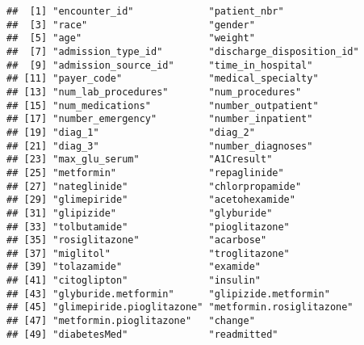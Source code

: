 \documentclass[
]{article}
\begin{document}
\begin{verbatim}
##  [1] "encounter_id"             "patient_nbr"             
##  [3] "race"                     "gender"                  
##  [5] "age"                      "weight"                  
##  [7] "admission_type_id"        "discharge_disposition_id"
##  [9] "admission_source_id"      "time_in_hospital"        
## [11] "payer_code"               "medical_specialty"       
## [13] "num_lab_procedures"       "num_procedures"          
## [15] "num_medications"          "number_outpatient"       
## [17] "number_emergency"         "number_inpatient"        
## [19] "diag_1"                   "diag_2"                  
## [21] "diag_3"                   "number_diagnoses"        
## [23] "max_glu_serum"            "A1Cresult"               
## [25] "metformin"                "repaglinide"             
## [27] "nateglinide"              "chlorpropamide"          
## [29] "glimepiride"              "acetohexamide"           
## [31] "glipizide"                "glyburide"               
## [33] "tolbutamide"              "pioglitazone"            
## [35] "rosiglitazone"            "acarbose"                
## [37] "miglitol"                 "troglitazone"            
## [39] "tolazamide"               "examide"                 
## [41] "citoglipton"              "insulin"                 
## [43] "glyburide.metformin"      "glipizide.metformin"     
## [45] "glimepiride.pioglitazone" "metformin.rosiglitazone" 
## [47] "metformin.pioglitazone"   "change"                  
## [49] "diabetesMed"              "readmitted"
\end{verbatim}
\end{document}
